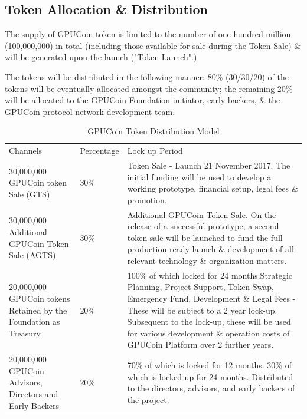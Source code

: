 \documentclass{article}
\begin{document}
\subsection{Token Allocation \& Distribution} %
\label{sub:token_allocation_and_distribution}
 The supply of GPUCoin token is limited to the number of one hundred million (100,000,000) in total (including those available for sale during the Token Sale) \& will be generated upon the launch ("Token Launch".)

 The tokens will be distributed in the following manner:
80\% (30/30/20) of the tokens will be eventually allocated amongst the community; the remaining 20\% will be allocated to the GPUCoin Foundation initiator, early backers, \& the GPUCoin protocol network development team.


\begin{table}[!htb]
\centering
\begin{tabular}{ |p{2.8cm}|p{2.5cm}|p{5cm}|}
\hline
\rowcolor{lightgray} \multicolumn{3}{|c|}{GPUCoin Token Distribution Model} \\
\hline
Channels & Percentage & Lock up Period \\
\hline
30,000,000 GPUCoin token Sale (GTS) & 30\% & Token Sale - Launch 21 November 2017. The initial funding will be used to develop a working prototype, financial setup, legal fees \& promotion.
 \\
 \hline
30,000,000 Additional GPUCoin Token Sale (AGTS) & 30\% & Additional GPUCoin Token Sale. On the release of a successful prototype, a second token sale will be launched to fund the full production ready launch \& development of all relevant technology \& organization matters.
\\
\hline
20,000,000 GPUCoin tokens Retained by the Foundation as Treasury & 20\% & 100\% of which locked for 24 months.Strategic Planning, Project Support, Token Swap, Emergency Fund, Development \& Legal Fees - These will be subject to a 2 year lock-up. Subsequent to the lock-up, these will be used for various development \& operation costs of GPUCoin Platform over 2 further years.
\\
\hline
20,000,000 GPUCoin Advisors, Directors and Early Backers & 20\% & 70\% of which is locked for 12 months. 30\% of which is locked up for 24 months. Distributed to the directors, advisors, and early backers of the
 project.
\\
 \hline
\end{tabular}
\caption{GPUCoin Token Distribution Model}
\label{table:hoot_token_distribution_model}
\end{table}

\end{document}
